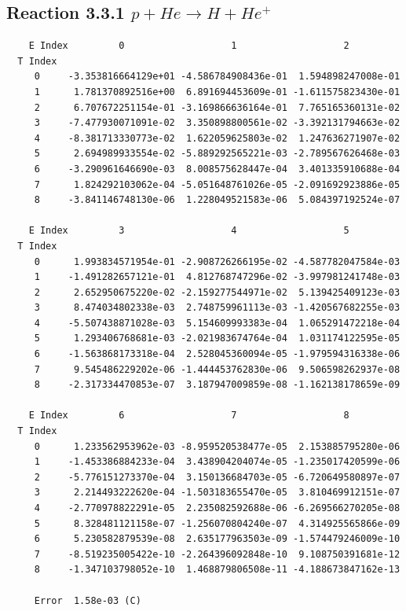 \documentclass[12pt,dvipdfmx]{article}
\begin{document}
\newpage
\subsection{
Reaction 3.3.1 $   p + He \rightarrow H + He^+$}


\begin{small}\begin{verbatim}
    E Index         0                   1                   2
  T Index
     0     -3.353816664129e+01 -4.586784908436e-01  1.594898247008e-01
     1      1.781370892516e+00  6.891694453609e-01 -1.611575823430e-01
     2      6.707672251154e-01 -3.169866636164e-01  7.765165360131e-02
     3     -7.477930071091e-02  3.350898800561e-02 -3.392131794663e-02
     4     -8.381713330773e-02  1.622059625803e-02  1.247636271907e-02
     5      2.694989933554e-02 -5.889292565221e-03 -2.789567626468e-03
     6     -3.290961646690e-03  8.008575628447e-04  3.401335910688e-04
     7      1.824292103062e-04 -5.051648761026e-05 -2.091692923886e-05
     8     -3.841146748130e-06  1.228049521583e-06  5.084397192524e-07

    E Index         3                   4                   5
  T Index
     0      1.993834571954e-01 -2.908726266195e-02 -4.587782047584e-03
     1     -1.491282657121e-01  4.812768747296e-02 -3.997981241748e-03
     2      2.652950675220e-02 -2.159277544971e-02  5.139425409123e-03
     3      8.474034802338e-03  2.748759961113e-03 -1.420567682255e-03
     4     -5.507438871028e-03  5.154609993383e-04  1.065291472218e-04
     5      1.293406768681e-03 -2.021983674764e-04  1.031174122595e-05
     6     -1.563868173318e-04  2.528045360094e-05 -1.979594316338e-06
     7      9.545486229202e-06 -1.444453762830e-06  9.506598262937e-08
     8     -2.317334470853e-07  3.187947009859e-08 -1.162138178659e-09

    E Index         6                   7                   8
  T Index
     0      1.233562953962e-03 -8.959520538477e-05  2.153885795280e-06
     1     -1.453386884233e-04  3.438904204074e-05 -1.235017420599e-06
     2     -5.776151273370e-04  3.150136684703e-05 -6.720649580897e-07
     3      2.214493222620e-04 -1.503183655470e-05  3.810469912151e-07
     4     -2.770978822291e-05  2.235082592688e-06 -6.269566270205e-08
     5      8.328481121158e-07 -1.256070804240e-07  4.314925565866e-09
     6      5.230582879539e-08  2.635177963503e-09 -1.574479246009e-10
     7     -8.519235005422e-10 -2.264396092848e-10  9.108750391681e-12
     8     -1.347103798052e-10  1.468879806508e-11 -4.188673847162e-13

     Error  1.58e-03 (C)
\end{verbatim}\end{small}
\end{document}
